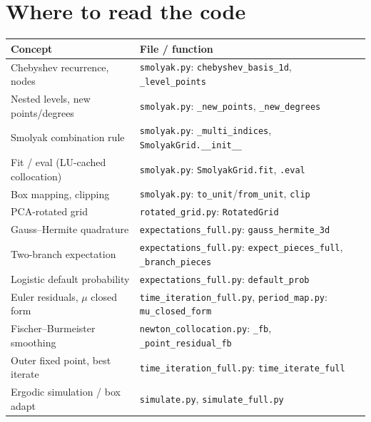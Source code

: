 \documentclass[11pt]{article}
\newcommand{\code}[1]{\texttt{#1}}
\begin{document}
\section*{Where to read the code}
\begin{center}
\small
\begin{tabular}{@{}ll@{}}
\toprule
Concept & File / function \\
\midrule
Chebyshev recurrence, nodes & \code{smolyak.py}: \code{chebyshev\_basis\_1d}, \code{\_level\_points} \\
Nested levels, new points/degrees & \code{smolyak.py}: \code{\_new\_points}, \code{\_new\_degrees} \\
Smolyak combination rule & \code{smolyak.py}: \code{\_multi\_indices}, \code{SmolyakGrid.\_\_init\_\_} \\
Fit / eval (LU-cached collocation) & \code{smolyak.py}: \code{SmolyakGrid.fit}, \code{.eval} \\
Box mapping, clipping & \code{smolyak.py}: \code{to\_unit}/\code{from\_unit}, \code{clip} \\
PCA-rotated grid & \code{rotated\_grid.py}: \code{RotatedGrid} \\
Gauss--Hermite quadrature & \code{expectations\_full.py}: \code{gauss\_hermite\_3d} \\
Two-branch expectation & \code{expectations\_full.py}: \code{expect\_pieces\_full}, \code{\_branch\_pieces} \\
Logistic default probability & \code{expectations\_full.py}: \code{default\_prob} \\
Euler residuals, $\mu$ closed form & \code{time\_iteration\_full.py}, \code{period\_map.py}: \code{mu\_closed\_form} \\
Fischer--Burmeister smoothing & \code{newton\_collocation.py}: \code{\_fb}, \code{\_point\_residual\_fb} \\
Outer fixed point, best iterate & \code{time\_iteration\_full.py}: \code{time\_iterate\_full} \\
Ergodic simulation / box adapt & \code{simulate.py}, \code{simulate\_full.py} \\
\bottomrule
\end{tabular}
\end{center}
\end{document}
